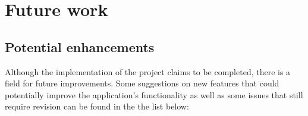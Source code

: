

%


\section{Future work}
\label{sec:ch8_future_work}

\subsection{Potential enhancements}

Although the implementation of the project claims to be completed, there is a field for future improvements. Some suggestions on new features that could potentially improve the application\rq{}s functionality as well as some issues that still require revision can be found in the the list below:


